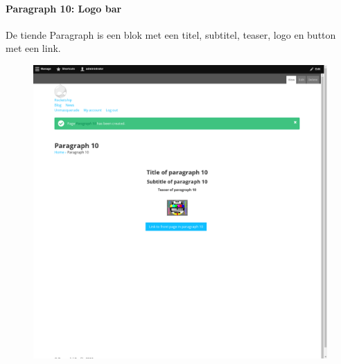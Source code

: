 \paragraph{Paragraph 10: Logo bar}
De tiende Paragraph is een blok met een titel, subtitel, teaser, logo en button met een link.
\begin{figure}[h]
\includegraphics[width=1\textwidth]{img/p010.png}
\end{figure}

\clearpage
